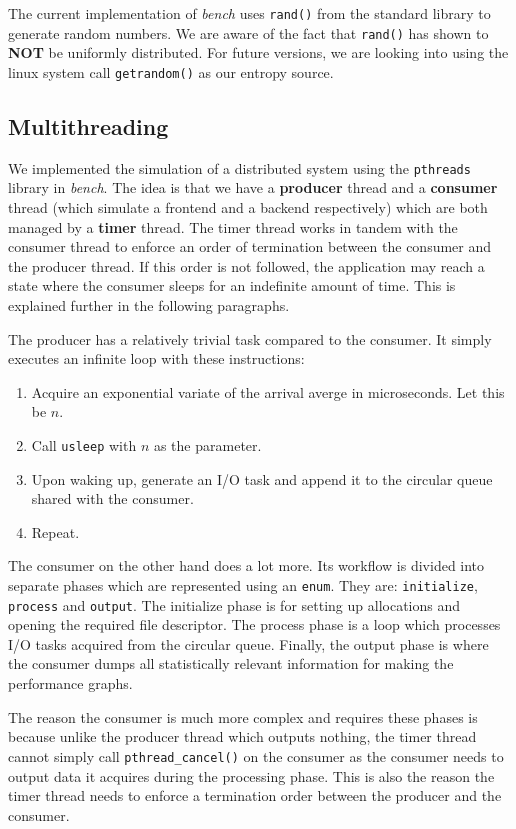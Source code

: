 \documentclass[10pt, author, twocolumn]{article}
\begin{document}
The current implementation of \textit{bench} uses \texttt{rand()} from the standard library to generate random numbers. We are aware of the fact that \texttt{rand()} has shown to \textbf{NOT} be uniformly distributed. For future versions, we are looking into using the linux system call \texttt{getrandom()} as our entropy source. 

\subsection{Multithreading}
We implemented the simulation of a distributed system using the \texttt{pthreads} library in \textit{bench}. The idea is that we have a \textbf{producer} thread and a \textbf{consumer} thread (which simulate a frontend and a backend respectively) which are both managed by a \textbf{timer} thread. The timer thread works in tandem with the consumer thread to enforce an order of termination between the consumer and the producer thread. If this order is not followed, the application may reach a state where the consumer sleeps for an indefinite amount of time. This is explained further in the following paragraphs.

The producer has a relatively trivial task compared to the consumer. It simply executes an infinite loop with these instructions: 

\begin{enumerate}
    \item Acquire an exponential variate of the arrival averge in microseconds. Let this be $n$.
    \item Call \texttt{usleep} with $n$ as the parameter. 
    \item Upon waking up, generate an I/O task and append it to the circular queue shared with the consumer. 
    \item Repeat. 
\end{enumerate}

The consumer on the other hand does a lot more. Its workflow is divided into separate phases which are represented using an \texttt{enum}. They are: \texttt{initialize}, \texttt{process} and \texttt{output}. The initialize phase is for setting up allocations and opening the required file descriptor. The process phase is a loop which processes I/O tasks acquired from the circular queue. Finally, the output phase is where the consumer dumps all statistically relevant information for making the performance graphs. 

The reason the consumer is much more complex and requires these phases is because unlike the producer thread which outputs nothing, the timer thread cannot simply call \texttt{pthread\_cancel()} on the consumer as the consumer needs to output data it acquires during the processing phase. This is also the reason the timer thread needs to enforce a termination order between the producer and the consumer. 
\end{document}
